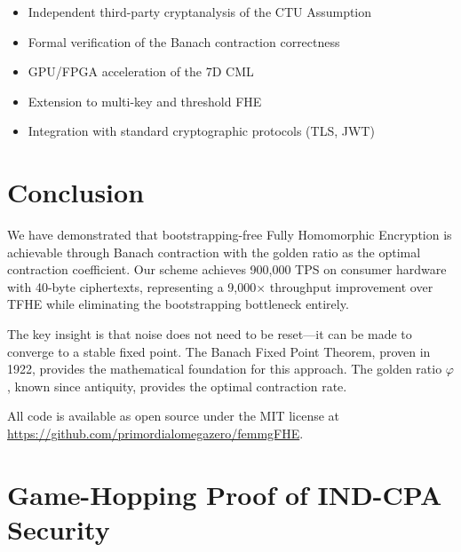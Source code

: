 \documentclass[11pt,a4paper]{article}
\begin{document}
\begin{itemize}
    \item Independent third-party cryptanalysis of the CTU Assumption
    \item Formal verification of the Banach contraction correctness
    \item GPU/FPGA acceleration of the 7D CML
    \item Extension to multi-key and threshold FHE
    \item Integration with standard cryptographic protocols (TLS, JWT)
\end{itemize}

\section{Conclusion}
\label{sec:conclusion}

We have demonstrated that bootstrapping-free Fully Homomorphic Encryption is achievable through Banach contraction with the golden ratio as the optimal contraction coefficient. Our scheme achieves 900,000 TPS on consumer hardware with 40-byte ciphertexts, representing a 9,000$\times$ throughput improvement over TFHE while eliminating the bootstrapping bottleneck entirely.

The key insight is that noise does not need to be reset---it can be made to converge to a stable fixed point. The Banach Fixed Point Theorem, proven in 1922, provides the mathematical foundation for this approach. The golden ratio $\varphi$, known since antiquity, provides the optimal contraction rate.

All code is available as open source under the MIT license at \url{https://github.com/primordialomegazero/femmgFHE}.

\appendix
\section{Game-Hopping Proof of IND-CPA Security}
\label{app:gamehopping}
\end{document}
